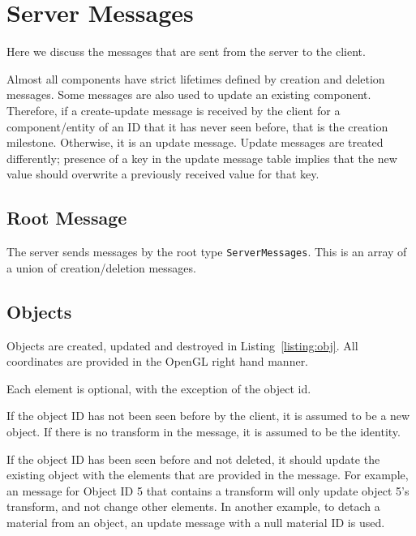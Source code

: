 \documentclass[11pt, oneside]{amsart}
\begin{document}
\section{Server Messages}
\label{sec:server_message}

Here we discuss the messages that are sent from the server to the client.

Almost all components have strict lifetimes defined by creation and deletion messages. Some messages are also used to update an existing component. Therefore, if a create-update message is received by the client for a component/entity of an ID that it has never seen before, that is the creation milestone. Otherwise, it is an update message. Update messages are treated differently; presence of a key in the update message table implies that the new value should overwrite a previously received value for that key.

\subsection{Root Message}

The server sends messages by the root type \texttt{ServerMessages}. This is an array of a union of creation/deletion messages.



\subsection{Objects}

Objects are created, updated and destroyed in Listing~\ref{listing:obj}. All coordinates are provided in the OpenGL right hand manner.



Each element is optional, with the exception of the object id.

If the object ID has not been seen before by the client, it is assumed to be a new object. If there is no transform in the message, it is assumed to be the identity.

If the object ID has been seen before and not deleted, it should update the existing object with the elements that are provided in the message. For example, an message for Object ID 5 that contains a transform will only update object 5's transform, and not change other elements. In another example, to detach a material from an object, an update message with a null material ID is used.
\end{document}
